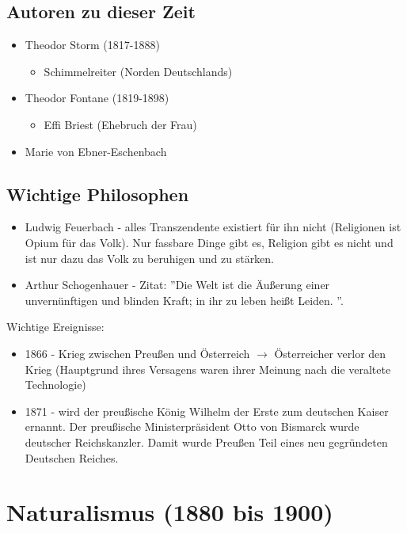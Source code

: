 \documentclass[12pt,a4paper]{article}
\begin{document}
\subsection{Autoren zu dieser Zeit}
\begin{itemize}
\item Theodor Storm (1817-1888)
	\begin{itemize}
	\item Schimmelreiter (Norden Deutschlands)
	\end{itemize}
\item Theodor Fontane (1819-1898)
	\begin{itemize}
	\item Effi Briest (Ehebruch der Frau)
	\end{itemize}
\item Marie von Ebner-Eschenbach
\end{itemize}

\subsection{Wichtige Philosophen}

\begin{itemize}
\item Ludwig Feuerbach - alles Transzendente existiert für ihn nicht (Religionen ist Opium für das Volk). Nur fassbare Dinge gibt es, Religion gibt es nicht und ist nur dazu das Volk zu beruhigen und zu stärken.
\item Arthur Schogenhauer - Zitat: ''Die Welt ist die Äußerung einer unvernünftigen und blinden Kraft; in ihr zu leben heißt Leiden. ''. 
\end{itemize}	

Wichtige Ereignisse:

\begin{itemize}
\item 1866 - Krieg zwischen Preußen und Österreich $\rightarrow$ Österreicher verlor den Krieg (Hauptgrund ihres Versagens waren ihrer Meinung nach die veraltete Technologie)
\item 1871 - wird der preußische König Wilhelm der Erste zum deutschen Kaiser ernannt. Der preußische Ministerpräsident Otto von Bismarck wurde deutscher Reichskanzler. Damit wurde Preußen Teil eines neu gegründeten Deutschen Reiches.
\end{itemize}

\newpage

\section{Naturalismus (1880 bis 1900)}
\end{document}
